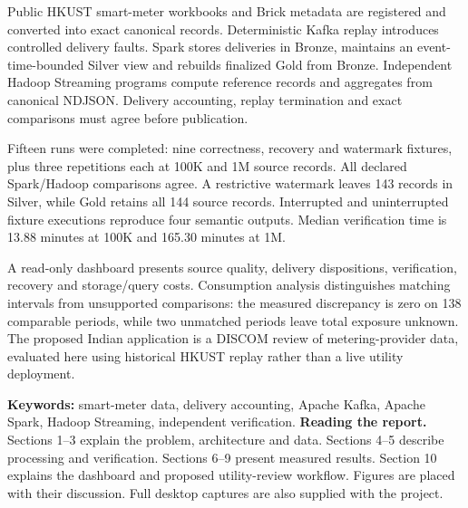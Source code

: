 \documentclass[11pt,a4paper]{article}
\begin{document}
Public HKUST smart-meter workbooks and Brick metadata are registered and converted into exact canonical records. Deterministic Kafka replay introduces controlled delivery faults. Spark stores deliveries in Bronze, maintains an event-time-bounded Silver view and rebuilds finalized Gold from Bronze. Independent Hadoop Streaming programs compute reference records and aggregates from canonical NDJSON. Delivery accounting, replay termination and exact comparisons must agree before publication.

Fifteen runs were completed: nine correctness, recovery and watermark fixtures, plus three repetitions each at 100K and 1M source records. All declared Spark/Hadoop comparisons agree. A restrictive watermark leaves 143 records in Silver, while Gold retains all 144 source records. Interrupted and uninterrupted fixture executions reproduce four semantic outputs. Median verification time is 13.88 minutes at 100K and 165.30 minutes at 1M.

A read-only dashboard presents source quality, delivery dispositions, verification, recovery and storage/query costs. Consumption analysis distinguishes matching intervals from unsupported comparisons: the measured discrepancy is zero on 138 comparable periods, while two unmatched periods leave total exposure unknown. The proposed Indian application is a DISCOM review of metering-provider data, evaluated here using historical HKUST replay rather than a live utility deployment.

\vspace{8mm}
\textbf{Keywords:} smart-meter data, delivery accounting, Apache Kafka, Apache Spark, Hadoop Streaming, independent verification.
\clearpage
\setcounter{tocdepth}{1}\tableofcontents
\vspace{6mm}
\textbf{Reading the report.} Sections 1--3 explain the problem, architecture and data. Sections 4--5 describe processing and verification. Sections 6--9 present measured results. Section 10 explains the dashboard and proposed utility-review workflow. Figures are placed with their discussion. Full desktop captures are also supplied with the project.

\vspace{4mm}
\end{document}
